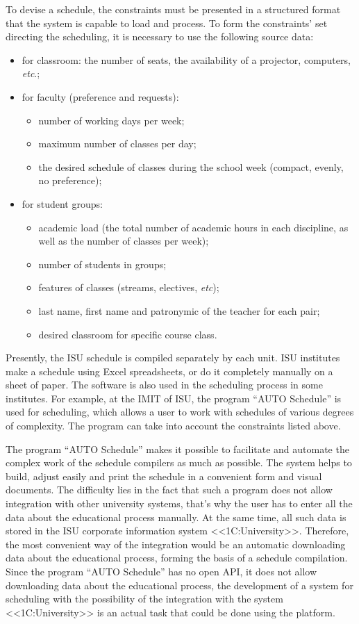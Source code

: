 \documentclass[
]{aiitart}
\begin{document}
To devise a schedule, the constraints must be presented in a structured format that the system is capable to load and process.  To form the constraints' set directing the scheduling, it is necessary to use the following source data:
\begin{itemize}
    \item for classroom: the number of seats, the availability of a projector, computers, \emph{etc}.;
    \item for faculty (preference and requests):
    \begin{itemize}
        \item number of working days per week;
        \item maximum number of classes per day;
        \item the desired schedule of classes during the school week (compact, evenly, no preference);
    \end{itemize}
    \item for student groups:
    \begin{itemize}
        \item academic load (the total number of academic hours in each discipline, as well as the number of classes per week);
        \item number of students in groups;
        \item features of classes (streams, electives, \emph{etc});
        \item last name, first name and patronymic of the teacher for each pair;
        \item desired classroom for specific course class.
    \end{itemize}
\end{itemize}

Presently, the ISU schedule is compiled separately by each unit.  ISU institutes make a schedule using Excel spreadsheets, or do it completely manually on a sheet of paper. The software is also used in the scheduling process in some institutes. For example, at the IMIT of ISU, the program ``AUTO Schedule'' is used for scheduling, which allows a user to work with schedules of various degrees of complexity. The program can take into account the constraints listed above.

The program ``AUTO Schedule'' makes it possible to facilitate and automate the complex work of the schedule compilers as much as possible. The system helps to build, adjust easily and print the schedule in a convenient form  and visual documents. The difficulty lies in the fact that such a program does not allow integration with other university systems, that's why the user has to enter all the data about the educational process manually.  At the same time, all such data is stored in the ISU corporate information system <<1C:University>>. Therefore, the most convenient way of the integration would be an automatic downloading data about the educational process, forming the basis of a schedule compilation. Since the program ``AUTO Schedule'' has no open API, it does not allow downloading data about the educational process, the development of a system for scheduling with the possibility of the integration with the system <<1C:University>> is an actual task that could be done using the platform.
\end{document}
